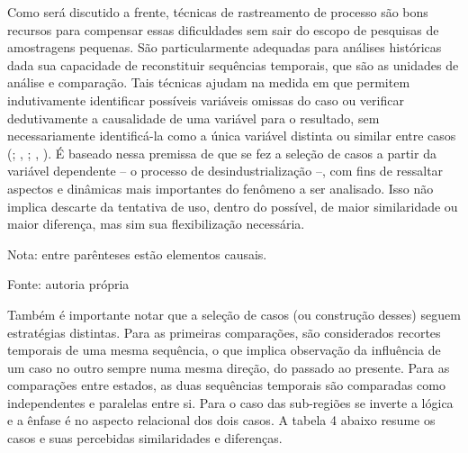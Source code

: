 Como será discutido a frente, técnicas de rastreamento de processo são
bons recursos para compensar essas dificuldades sem sair do escopo de
pesquisas de amostragens pequenas. São particularmente adequadas para
análises históricas dada sua capacidade de reconstituir sequências
temporais, que são as unidades de análise e comparação. Tais técnicas
ajudam na medida em que permitem indutivamente identificar possíveis
variáveis omissas do caso ou verificar dedutivamente a causalidade de
uma variável para o resultado, sem necessariamente identificá-la como a
única variável distinta ou similar entre casos (; \citeauthor{george_case_2005}, \citeyear{george_case_2005};
\citeauthor{mahoney_process_2015}, \citeyear{mahoney_process_2015}). É
baseado nessa premissa de que se fez a seleção de casos a partir da
variável dependente -- o processo de desindustrialização --, com fins de
ressaltar aspectos e dinâmicas mais importantes do fenômeno a ser
analisado. Isso não implica descarte da tentativa de uso, dentro do
possível, de maior similaridade ou maior diferença, mas sim sua
flexibilização necessária.

\begin{table}[htbp]
\centering
\caption{Problemas lógicos na seleção de casos mais similares e distintos}
\label{tab:cap03-problemas-logicos}
\end{table}

Nota: entre parênteses estão elementos causais.

Fonte: autoria própria

Também é importante notar que a seleção de casos (ou construção desses)
seguem estratégias distintas. Para as primeiras comparações, são
considerados recortes temporais de uma mesma sequência, o que implica
observação da influência de um caso no outro sempre numa mesma direção,
do passado ao presente. Para as comparações entre estados, as duas
sequências temporais são comparadas como independentes e paralelas
entre si. Para o caso das sub-regiões se inverte a lógica e a ênfase é
no aspecto relacional dos dois casos. A tabela 4 abaixo resume os casos
e suas percebidas similaridades e diferenças.

\begin{table}[htbp]
\centering
\caption{Casos analíticos e estratégia de seleção}
\label{tab:cap03-casos-estrategia}
\end{table}

